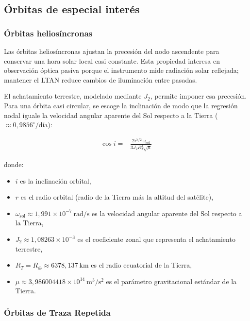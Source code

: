 \subsection{Órbitas de especial interés}

\subsubsection{Órbitas heliosíncronas}\label{sec:SSO}

Las órbitas heliosíncronas ajustan la precesión del nodo ascendente para conservar una hora solar local casi constante. Esta propiedad interesa en observación óptica pasiva porque el instrumento mide radiación solar reflejada; mantener el LTAN reduce cambios de iluminación entre pasadas.

El achatamiento terrestre, modelado mediante \(J_2\), permite imponer esa precesión. Para una órbita casi circular, se escoge la inclinación de modo que la regresión nodal iguale la velocidad angular aparente del Sol respecto a la Tierra (\( \approx 0{,}9856^\circ/\text{día} \)):

\begin{align}
\cos i = -\frac{2 r^{7/2} \, \omega_{\text{sol}}}{3 J_2 R_T^2 \sqrt{\mu}}
\label{eq:SSO_cond}
\end{align}

\noindent donde:

\begin{itemize}
    \item \( i \) es la inclinación orbital,
    \item \( r \) es el radio orbital (radio de la Tierra más la altitud del satélite),
    \item \( \omega_{\text{sol}} \approx 1{,}991 \times 10^{-7} \ \text{rad/s} \) es la velocidad angular aparente del Sol respecto a la Tierra,
    \item \( J_2 \approx 1{,}08263 \times 10^{-3} \) es el coeficiente zonal que representa el achatamiento terrestre,
    \item \( R_T=R_{\oplus}\approx 6378{,}137 \ \text{km} \) es el radio ecuatorial de la Tierra,
    \item \( \mu \approx 3{,}986004418 \times 10^{14} \ \text{m}^3/\text{s}^2 \) es el parámetro gravitacional estándar de la Tierra.
\end{itemize}

\subsubsection{Órbitas de Traza Repetida}

